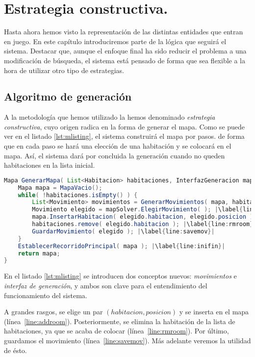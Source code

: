 \chapter{Estrategia constructiva.}\label{cap:capitulo4}

Hasta ahora hemos visto la representación de las distintas entidades que entran en juego. En este capítulo introduciremos parte de la lógica que seguirá el sistema. Destacar que, aunque el enfoque final ha sido reducir el problema a una modificación de búsqueda, el sistema está pensado de forma que sea flexible a la hora de utilizar otro tipo de estrategias.


\section{Algoritmo de generación}
A la metodología que hemos utilizado la hemos denominado \emph{estrategia constructiva}, cuyo origen radica en la forma de generar el mapa. Como se puede ver en el listado \ref{lst:mlisting}, el sistema construirá el mapa por pasos. de forma que en cada paso se hará una elección de una habitación y se colocará en el mapa. Así, el sistema dará por concluida la generación cuando no queden habitaciones en la lista inicial.

\begin{lstlisting}[caption={Algoritmo constructivo para generar mapas},label={lst:mlisting},language=Java,escapechar=|]
Mapa GenerarMapa( List<Habitacion> habitaciones, InterfazGeneracion mapSolver ) {
	Mapa mapa = MapaVacio();
	while( !habitaciones.isEmpty() ) {
		List<Movimiento> movimientos = GenerarMovimientos( mapa, habitaciones ); |\label{line:movgen}|
		Movimiento elegido = mapSolver.ElegirMovimiento( ); |\label{line:ifaceselect}|
		mapa.InsertarHabitacion( elegido.habitacion, elegido.posicion ); |\label{line:addroom}|
		habitaciones.remove( elegido.habitacion ); |\label{line:rmroom}|
		GuardarMovimiento( elegido ); |\label{line:savemov}|
	}
	EstablecerRecorridoPrincipal( mapa ); |\label{line:inifin}|
	return mapa;
}
\end{lstlisting}

En el listado \ref{lst:mlisting} se introducen dos conceptos nuevos: \emph{movimientos} e \emph{interfaz de generación}, y ambos son clave para el entendimiento del funcionamiento del sistema.

A grandes rasgos, se elige un par $(habitacion, posicion)$ y se inserta en el mapa (línea~\ref{line:addroom}). Posteriormente, se elimina la habitación de la lista de habitaciones, ya que se acaba de colocar (línea~\ref{line:rmroom}). Por último, guardamos el movimiento (línea~\ref{line:savemov}). Más adelante veremos la utilidad de ésto.

